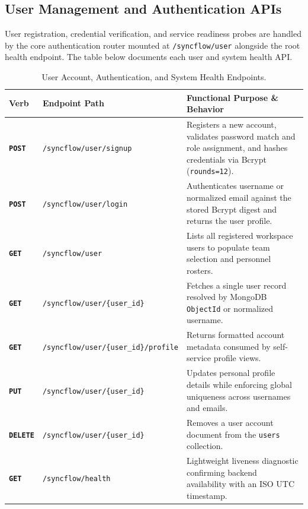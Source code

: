 \vspace{6mm}

\subsection{User Management and Authentication APIs}
User registration, credential verification, and service readiness probes are handled by the core authentication router mounted at \texttt{/syncflow/user} alongside the root health endpoint. The table below documents each user and system health API.

\vspace{4mm}

\begin{table}[H]
\centering
\small
\setlength{\tabcolsep}{5pt}
\renewcommand{\arraystretch}{1.28}
\caption*{User Account, Authentication, and System Health Endpoints.}
\vspace{-2pt}
\begin{tabularx}{\textwidth}{p{1.3cm} >{\raggedright\arraybackslash}p{6.0cm} X}
\toprule
\textbf{Verb} & \textbf{Endpoint Path} & \textbf{Functional Purpose \& Behavior} \\
\midrule
\textbf{\texttt{POST}} & \texttt{/syncflow/user/signup} & Registers a new account, validates password match and role assignment, and hashes credentials via Bcrypt (\texttt{rounds=12}). \\
\textbf{\texttt{POST}} & \texttt{/syncflow/user/login} & Authenticates username or normalized email against the stored Bcrypt digest and returns the user profile. \\
\textbf{\texttt{GET}} & \texttt{/syncflow/user} & Lists all registered workspace users to populate team selection and personnel rosters. \\
\textbf{\texttt{GET}} & \texttt{/syncflow/user/\{user\_id\}} & Fetches a single user record resolved by MongoDB \texttt{ObjectId} or normalized username. \\
\textbf{\texttt{GET}} & \texttt{/syncflow/user/\{user\_id\}/\allowbreak profile} & Returns formatted account metadata consumed by self-service profile views. \\
\textbf{\texttt{PUT}} & \texttt{/syncflow/user/\{user\_id\}} & Updates personal profile details while enforcing global uniqueness across usernames and emails. \\
\textbf{\texttt{DELETE}} & \texttt{/syncflow/user/\{user\_id\}} & Removes a user account document from the \texttt{users} collection. \\
\textbf{\texttt{GET}} & \texttt{/syncflow/health} & Lightweight liveness diagnostic confirming backend availability with an ISO UTC timestamp. \\
\bottomrule
\end{tabularx}
\end{table}

